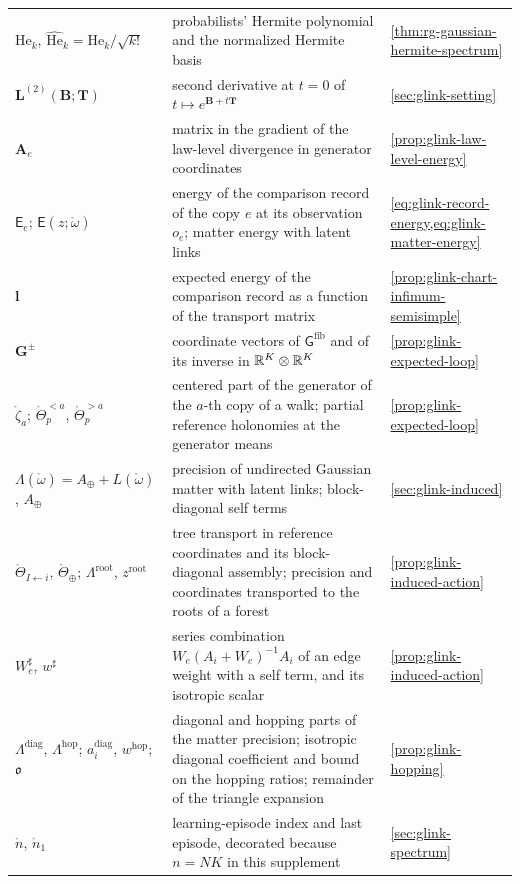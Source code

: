 {\begin{longtable}{@{}>{\raggedright\arraybackslash}p{}
>{\raggedright\arraybackslash}p{}
>{\raggedright\arraybackslash}p{}@{}}
$\mathrm{He}_k$, $\widehat{\mathrm{He}}_k=\mathrm{He}_k/\sqrt{k!}$ & probabilists' Hermite polynomial and the normalized Hermite basis & \cref{thm:rg-gaussian-hermite-spectrum} \\
$\mathbf L^{(2)}(\mathbf B;\mathbf T)$ & second derivative at $t=0$ of $t\mapsto e^{\mathbf B+t\mathbf T}$ & \cref{sec:glink-setting} \\
$\mathbf A_e$ & matrix in the gradient of the law-level divergence in generator coordinates & \cref{prop:glink-law-level-energy} \\
$\mathsf E_e$; $\mathsf E(z;\mathring\omega)$ & energy of the comparison record of the copy $e$ at its observation $o_e$; matter energy with latent links & \cref{eq:glink-record-energy,eq:glink-matter-energy} \\
$\mathbf l$ & expected energy of the comparison record as a function of the transport matrix & \cref{prop:glink-chart-infimum-semisimple} \\
$\mathbf G^\pm$ & coordinate vectors of $\mathsf G^{\mathrm{fib}}$ and of its inverse in $\mathbb R^K\otimes\mathbb R^K$ & \cref{prop:glink-expected-loop} \\
$\mathring\zeta_a$; $\mathring\Theta^{<a}_p$, $\mathring\Theta^{>a}_p$ & centered part of the generator of the $a$-th copy of a walk; partial reference holonomies at the generator means & \cref{prop:glink-expected-loop} \\
$\Lambda(\mathring\omega)=A_\oplus+L(\mathring\omega)$, $A_\oplus$ & precision of undirected Gaussian matter with latent links; block-diagonal self terms & \cref{sec:glink-induced} \\
$\mathring\Theta_{I\leftarrow i}$, $\mathring\Theta_\oplus$; $\Lambda^{\mathrm{root}}$, $z^{\mathrm{root}}$ & tree transport in reference coordinates and its block-diagonal assembly; precision and coordinates transported to the roots of a forest & \cref{prop:glink-induced-action} \\
$W_e^\sharp$, $w^\sharp$ & series combination $W_e(A_i+W_e)^{-1}A_i$ of an edge weight with a self term, and its isotropic scalar & \cref{prop:glink-induced-action} \\
$\Lambda^{\mathrm{diag}}$, $\Lambda^{\mathrm{hop}}$; $a^{\mathrm{diag}}_i$, $w^{\mathrm{hop}}$; $\mathfrak o$ & diagonal and hopping parts of the matter precision; isotropic diagonal coefficient and bound on the hopping ratios; remainder of the triangle expansion & \cref{prop:glink-hopping} \\
$\mathring n$, $\mathring n_1$ & learning-episode index and last episode, decorated because $n=NK$ in this supplement & \cref{sec:glink-spectrum} \\
\end{longtable}
}

